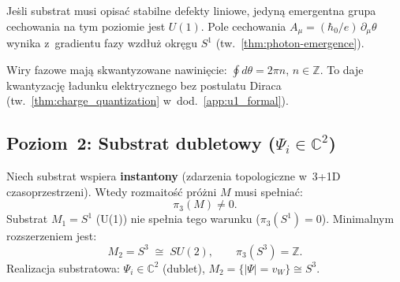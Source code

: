 \begin{corollary}\label{cor:D2-U1-forced}
Je\.sli substrat musi opisa\'c stabilne defekty liniowe,
jedyn\k{a} emergentna grupa cechowania na tym poziomie
jest $U(1)$. Pole cechowania $A_\mu = (\hbar_0/e)\,\partial_\mu\theta$
wynika z~gradientu fazy wzd\l{}u\.z okr\k{e}gu $S^1$
(tw.~\ref{thm:photon-emergence}).
\end{corollary}

\begin{remark}[Kwantyzacja \l{}adunku z~$\pi_1 = \mathbb{Z}$]%
\label{rem:D2-charge-quant}
Wiry fazowe maj\k{a} skwantyzowane nawinięcie:
$\oint d\theta = 2\pi n$, $n \in \mathbb{Z}$.
To daje kwantyzacj\k{e} \l{}adunku elektrycznego
bez postulatu Diraca (tw.~\ref{thm:charge_quantization}
w~dod.~\ref{app:u1_formal}).
\end{remark}

\subsection{Poziom~2: Substrat dubletowy ($\Psi_i \in \mathbb{C}^2$)}%
\label{ssec:D2-level2}

\begin{theorem}%
\label{thm:D2-instanton-necessary}

Niech substrat wspiera \textbf{instantony} (zdarzenia topologiczne
w~3+1D czasoprzestrzeni). Wtedy rozmaito\'s\'c pr\'o\.zni
$M$ musi spe\l{}nia\'c:
\begin{equation}\label{eq:D2-pi3-required}
  \pi_3(M) \neq 0.
\end{equation}
Substrat $M_1 = S^1$ (U(1)) nie spe\l{}nia tego warunku
($\pi_3(S^1) = 0$). Minimalnym rozszerzeniem jest:
\begin{equation}\label{eq:D2-M2}
  M_2 = S^3 \;\cong\; SU(2),
  \qquad
  \pi_3(S^3) = \mathbb{Z}.
\end{equation}
Realizacja substratowa: $\Psi_i \in \mathbb{C}^2$ (dublet),
$M_2 = \{|\Psi| = v_W\} \cong S^3$.
\end{theorem}

